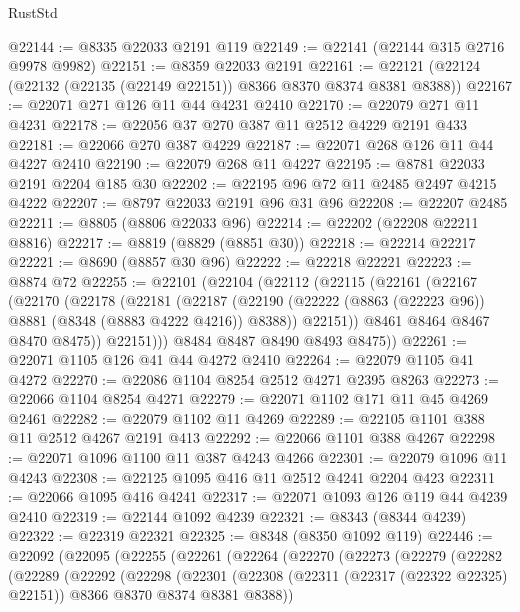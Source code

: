 \begin{lexlean}{RustStd}
\begin{coremodule}
@22144 := @8335 @22033 @2191 @119
@22149 := @22141 (@22144 @315 @2716 @9978 @9982)
@22151 := @8359 @22033 @2191
@22161 := @22121 (@22124 (@22132 (@22135 (@22149 @22151)) @8366 @8370 @8374 @8381 @8388))
@22167 := @22071 @271 @126 @11 @44 @4231 @2410
@22170 := @22079 @271 @11 @4231
@22178 := @22056 @37 @270 @387 @11 @2512 @4229 @2191 @433
@22181 := @22066 @270 @387 @4229
@22187 := @22071 @268 @126 @11 @44 @4227 @2410
@22190 := @22079 @268 @11 @4227
@22195 := @8781 @22033 @2191 @2204 @185 @30
@22202 := @22195 @96 @72 @11 @2485 @2497 @4215 @4222
@22207 := @8797 @22033 @2191 @96 @31 @96
@22208 := @22207 @2485
@22211 := @8805 (@8806 @22033 @96)
@22214 := @22202 (@22208 @22211 @8816)
@22217 := @8819 (@8829 (@8851 @30))
@22218 := @22214 @22217
@22221 := @8690 (@8857 @30 @96)
@22222 := @22218 @22221
@22223 := @8874 @72
@22255 := @22101
    (@22104
      (@22112
        (@22115
          (@22161
            (@22167
              (@22170
                (@22178
                  (@22181
                    (@22187
                      (@22190 (@22222 (@8863 (@22223 @96)) @8881 (@8348 (@8883 @4222 @4216)) @8388))
                      @22151))
                  @8461
                  @8464
                  @8467
                  @8470
                  @8475))
              @22151)))
        @8484
        @8487
        @8490
        @8493
        @8475))
@22261 := @22071 @1105 @126 @41 @44 @4272 @2410
@22264 := @22079 @1105 @41 @4272
@22270 := @22086 @1104 @8254 @2512 @4271 @2395 @8263
@22273 := @22066 @1104 @8254 @4271
@22279 := @22071 @1102 @171 @11 @45 @4269 @2461
@22282 := @22079 @1102 @11 @4269
@22289 := @22105 @1101 @388 @11 @2512 @4267 @2191 @413
@22292 := @22066 @1101 @388 @4267
@22298 := @22071 @1096 @1100 @11 @387 @4243 @4266
@22301 := @22079 @1096 @11 @4243
@22308 := @22125 @1095 @416 @11 @2512 @4241 @2204 @423
@22311 := @22066 @1095 @416 @4241
@22317 := @22071 @1093 @126 @119 @44 @4239 @2410
@22319 := @22144 @1092 @4239
@22321 := @8343 (@8344 @4239)
@22322 := @22319 @22321
@22325 := @8348 (@8350 @1092 @119)
@22446 := @22092
    (@22095
      (@22255
        (@22261
          (@22264
            (@22270
              (@22273
                (@22279
                  (@22282
                    (@22289
                      (@22292
                        (@22298
                          (@22301
                            (@22308
                              (@22311 (@22317 (@22322 @22325) @22151))
                              @8366
                              @8370
                              @8374
                              @8381
                              @8388))

\end{coremodule}
\end{lexlean}
